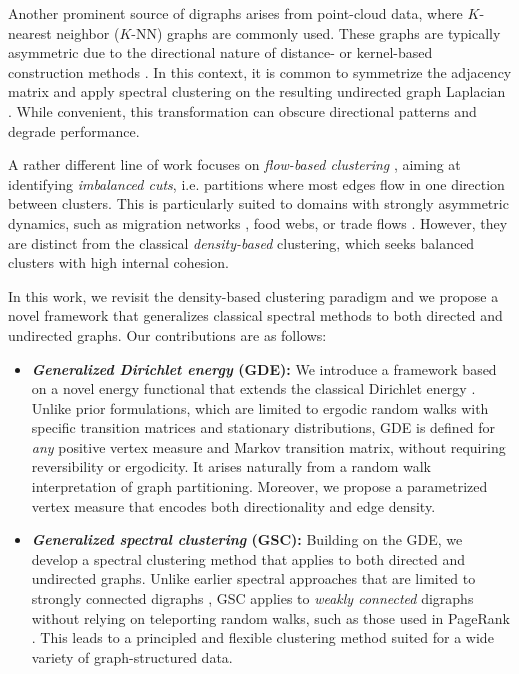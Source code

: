 \documentclass[10pt]{article} %
\makeatletter
\newcommand{\GSC}{GSC\xspace}
\newcommand{\GDE}{GDE\xspace}
\newcommand{\ie}   			{i.e.\@\xspace}
\makeatother
\begin{document}
Another prominent source of digraphs arises from point-cloud data, where $K$-nearest neighbor ($K$-NN) graphs are commonly used. These graphs are typically asymmetric due to the directional nature of distance- or kernel-based construction methods \citep{kernelsML2001}. In this context, it is common to symmetrize the adjacency matrix and apply spectral clustering on the resulting undirected graph Laplacian \citep{satuluri2011symmetrizations}. While convenient, this transformation can obscure directional patterns and degrade performance.

%

A rather different line of work focuses on \emph{flow-based clustering} \citep{cucuringu2020hermitian, laenen2020higher, coste2021simpler, hayashi2022skew}, aiming at identifying \emph{imbalanced cuts}, \ie partitions where most edges flow in one direction between clusters. This is particularly suited to domains with strongly asymmetric dynamics, such as migration networks \citep{cucuringu2020hermitian}, food webs, or trade flows \citep{laenen2020higher}. However, they are distinct from the classical \emph{density-based} clustering, which seeks balanced clusters with high internal cohesion.

In this work, we revisit the density-based clustering paradigm and we propose a novel framework that generalizes classical spectral methods to both directed and undirected graphs. Our contributions are as follows:
\begin{itemize}[leftmargin=1.4em, topsep=-0.5em, itemsep=-0.3em]
    \item \textbf{\textit{Generalized Dirichlet energy} (\GDE):} We introduce a %
		framework based on a novel energy functional that extends the classical Dirichlet energy \citep{montenegro2006mathematical}. Unlike prior formulations, which are limited to ergodic random walks with specific transition matrices and stationary distributions, \GDE is defined for \emph{any} positive vertex measure and Markov transition matrix, without requiring reversibility or ergodicity. It arises naturally from a random walk interpretation of graph partitioning. Moreover, we propose a parametrized vertex measure that encodes both directionality and edge density. %

    \item \textbf{\textit{Generalized spectral clustering} (\GSC):} Building on the \GDE, we develop a spectral clustering method that applies to both directed and undirected graphs. Unlike earlier spectral approaches that are limited to strongly connected digraphs \citep{zhou2005learning, palmer2020spectral}, \GSC applies to \emph{weakly connected} digraphs without relying on teleporting random walks, such as those used in PageRank \citep{page1999pagerank}. This leads to a principled and flexible clustering method suited for a wide variety of graph-structured data.
\end{itemize}
\newpage
\end{document}
